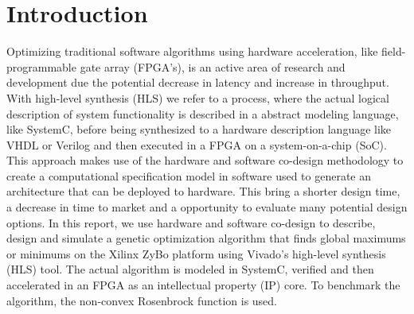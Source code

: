 \section{Introduction}
Optimizing traditional software algorithms using hardware acceleration, like field-programmable gate array (FPGA's), is an active area of research and development due the potential decrease in latency and increase in throughput. With high-level synthesis (HLS) we refer to a process, where the actual logical description of system functionality is described in a abstract modeling language, like SystemC, before being synthesized to a hardware description language like VHDL or Verilog and then executed in a FPGA on a system-on-a-chip (SoC). This approach makes use of the hardware and software co-design methodology to create a computational specification model in software used to generate an architecture that can be deployed to hardware. This bring a shorter design time, a decrease in time to market and a opportunity to evaluate many potential design options. In this report, we use hardware and software co-design to describe, design and simulate a genetic optimization algorithm that finds global maximums or minimums on the Xilinx ZyBo platform using Vivado's high-level synthesis (HLS) tool. The actual algorithm is modeled in SystemC, verified and then accelerated in an FPGA as an intellectual property (IP) core. To benchmark the algorithm, the non-convex Rosenbrock function is used.